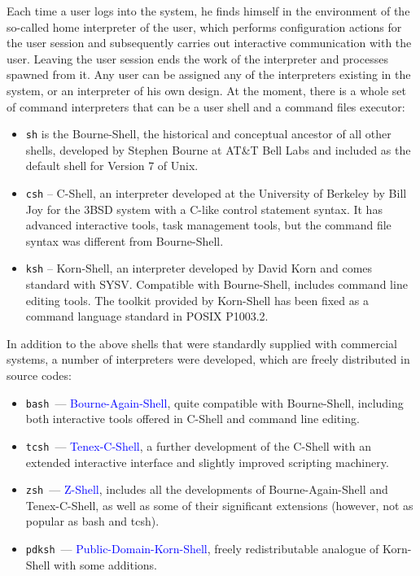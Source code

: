 \documentclass[12pt]{report}
\newcommand{\struct}[1]{\textcolor{blue}{#1}}
\begin{document}
\medskip
Each time a user logs into the system, he finds himself in the
environment of the so-called home interpreter of the user, which performs
configuration actions for the user session and subsequently carries out
interactive communication with the user. Leaving the user session ends
the work of the interpreter and processes spawned from it. Any user can
be assigned any of the interpreters existing in the system, or an
interpreter of his own design. At the moment, there is a whole set of
command interpreters that can be a user shell and a command files
executor:
\begin{itemize}
\item \verb|sh| is the Bourne-Shell, the historical and conceptual ancestor of
      all other shells, developed by Stephen Bourne at AT\&T Bell Labs and
       included as the default shell for Version 7 of Unix.
\item \verb|csh| -- C-Shell, an interpreter developed at the University of
      Berkeley by Bill Joy for the 3BSD system with a C-like control statement
      syntax. It has advanced interactive tools, task management tools, but the
      command file syntax was different from Bourne-Shell.
\item \verb|ksh| -- Korn-Shell, an interpreter developed by David Korn and comes
      standard with SYSV. Compatible with Bourne-Shell, includes command line
      editing tools. The toolkit provided by Korn-Shell has been fixed as a
      command language standard in POSIX P1003.2.
\end{itemize}

\medskip
In addition to the above shells that were standardly supplied with
commercial systems, a number of interpreters were developed,
which are freely distributed in source codes:
\begin{itemize}
\item \verb|bash|~--- \struct{Bourne-Again-Shell}, quite compatible with
      Bourne-Shell, including both interactive tools offered in C-Shell and
      command line editing.
\item \verb|tcsh|~--- \struct{Tenex-C-Shell}, a further development of the C-Shell
      with an extended interactive interface and slightly improved scripting
      machinery.
\item \verb|zsh|~--- \struct{Z-Shell}, includes all the developments of
      Bourne-Again-Shell and Tenex-C-Shell, as well as some of their
      significant extensions (however, not as popular as bash and tcsh).
\item \verb|pdksh|~--- \struct{Public-Domain-Korn-Shell}, freely redistributable
      analogue of Korn-Shell with some additions.
\end{itemize}
\end{document}
